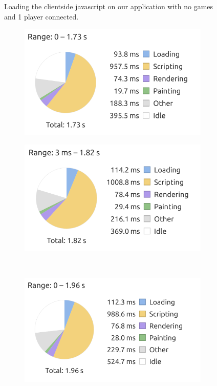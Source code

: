 \begin{figure}[H]
    \caption{Loading the clientside javascript on our application with no games and 1 player connected.}
\end{figure}

\begin{figure}[H]
    \centering
    \begin{subfigure}{0.49\textwidth}
        \includegraphics[width=\textwidth]{figure/clientsidePerformance/graph30games1.png}
    \end{subfigure}
    \begin{subfigure}{0.49\textwidth}
        \includegraphics[width=\textwidth]{figure/clientsidePerformance/graph30games2.png}
    \end{subfigure}
    \\
    \begin{subfigure}{0.5\textwidth}
        \includegraphics[width=\textwidth]{figure/clientsidePerformance/graph30games3.png}
    \end{subfigure}
    

\end{figure}
